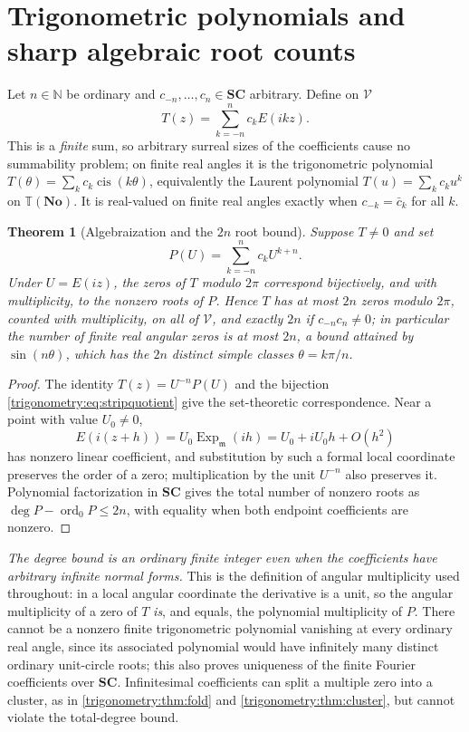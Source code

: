 \documentclass[11pt,letterpaper]{article}
\numberwithin{equation}{section}
\newtheorem{theorem}{Theorem}[section]
\theoremstyle{definition}
\theoremstyle{remark}
\newcommand{\No}{\mathbf{No}}
\newcommand{\SC}{\mathbf{SC}}
\newcommand{\N}{\mathbb N}
\newcommand{\mm}{\mathfrak m}
\newcommand{\TT}{\mathbb T}
\newcommand{\cis}{\operatorname{cis}}
\newcommand{\Ex}{\operatorname{Exp}_{\mm}}
\begin{document}
\section{Trigonometric polynomials and sharp algebraic root counts}
\label{trigonometry:sec:trigpoly}

Let $n\in\N$ be ordinary and $c_{-n},\dots,c_n\in\SC$ arbitrary. Define on $\mathscr V$
\begin{equation}\label{trigonometry:eq:trigpoly}
 T(z)=\sum_{k=-n}^nc_kE(ikz).
\end{equation}
This is a \emph{finite} sum, so arbitrary surreal sizes of the coefficients cause no summability
problem; on finite real angles it is the trigonometric polynomial
$T(\theta)=\sum_kc_k\cis(k\theta)$, equivalently the Laurent polynomial $T(u)=\sum_kc_ku^k$ on
$\TT(\No)$. It is real-valued on finite real angles exactly when $c_{-k}=\bar c_k$ for all $k$.

\begin{theorem}[Algebraization and the $2n$ root bound]\label{trigonometry:thm:polyroots}
Suppose $T\ne0$ and set
\begin{equation}\label{trigonometry:eq:algebraization}
 P(U)=\sum_{k=-n}^nc_kU^{k+n}.
\end{equation}
Under $U=E(iz)$, the zeros of $T$ modulo $2\pi$ correspond bijectively, \emph{and with
multiplicity}, to the nonzero roots of $P$. Hence $T$ has at most $2n$ zeros modulo $2\pi$, counted
with multiplicity, on all of $\mathscr V$, and exactly $2n$ if $c_{-n}c_n\ne0$; in particular the
number of finite real angular zeros is at most $2n$, a bound attained by $\sin(n\theta)$, which has
the $2n$ distinct simple classes $\theta=k\pi/n$.
\end{theorem}
\begin{proof}
The identity $T(z)=U^{-n}P(U)$ and the bijection \cref{trigonometry:eq:stripquotient} give the
set-theoretic correspondence. Near a point with value $U_0\ne0$,
\[
 E(i(z+h))=U_0\Ex(ih)=U_0+iU_0h+O(h^2)
\]
has nonzero linear coefficient, and substitution by such a formal local coordinate preserves the
order of a zero; multiplication by the unit $U^{-n}$ also preserves it. Polynomial factorization in
$\SC$ gives the total number of nonzero roots as $\deg P-\operatorname{ord}_0P\le2n$, with equality
when both endpoint coefficients are nonzero.
\end{proof}
\emph{The degree bound is an ordinary finite integer even when the coefficients have arbitrary
infinite normal forms.} This is the definition of angular multiplicity used throughout: in a local
angular coordinate the derivative is a unit, so the angular multiplicity of a zero of $T$
\emph{is}, and equals, the polynomial multiplicity of $P$. There cannot be a nonzero finite
trigonometric polynomial vanishing at every ordinary real angle, since its associated polynomial
would have infinitely many distinct ordinary unit-circle roots; this also proves uniqueness of the
finite Fourier coefficients over $\SC$. Infinitesimal coefficients can split a multiple zero into a
cluster, as in \cref{trigonometry:thm:fold} and \cref{trigonometry:thm:cluster}, but cannot violate
the total-degree bound.
\end{document}
